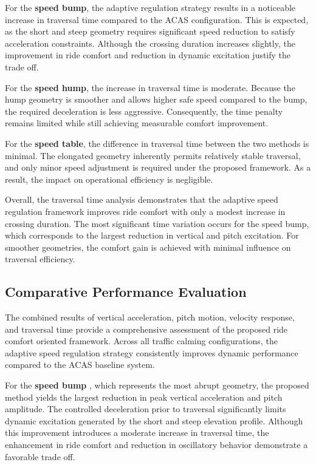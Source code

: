 \documentclass[a4paper,12pt,one side]{report}
\theoremstyle{definition}
\begin{document}
\begin{itemize}
For the \textbf{speed bump}, the adaptive regulation strategy results in a noticeable increase in traversal time compared to the ACAS configuration. This is expected, as the short and steep geometry requires significant speed reduction to satisfy acceleration constraints. Although the crossing duration increases slightly, the improvement in ride comfort and reduction in dynamic excitation justify the trade off.

For the \textbf{speed hump}, the increase in traversal time is moderate. Because the hump geometry is smoother and allows higher safe speed compared to the bump, the required deceleration is less aggressive. Consequently, the time penalty remains limited while still achieving measurable comfort improvement.

For the \textbf{speed table}, the difference in traversal time between the two methods is minimal. The elongated geometry inherently permits relatively stable traversal, and only minor speed adjustment is required under the proposed framework. As a result, the impact on operational efficiency is negligible.

Overall, the traversal time analysis demonstrates that the adaptive speed regulation framework improves ride comfort with only a modest increase in crossing duration. The most significant time variation occurs for the speed bump, which corresponds to the largest reduction in vertical and pitch excitation. For smoother geometries, the comfort gain is achieved with minimal influence on traversal efficiency.

\subsection{Comparative Performance Evaluation}

The combined results of vertical acceleration, pitch motion, velocity response, and traversal time provide a comprehensive assessment of the proposed ride comfort oriented framework. Across all traffic calming configurations, the adaptive speed regulation strategy consistently improves dynamic performance compared to the ACAS baseline system.

For the \textbf{speed bump} \cite{pau2001speed}, which represents the most abrupt geometry, the proposed method yields the largest reduction in peak vertical acceleration and pitch amplitude. The controlled deceleration prior to traversal significantly limits dynamic excitation generated by the short and steep elevation profile. Although this improvement introduces a moderate increase in traversal time, the enhancement in ride comfort and reduction in oscillatory behavior demonstrate a favorable trade off.


\end{itemize}
\end{document}
